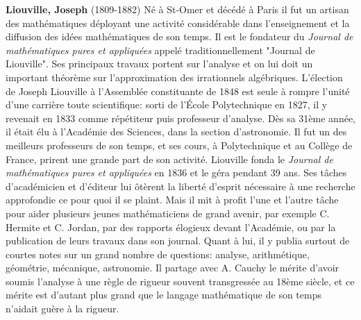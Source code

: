 \textbf{Liouville, Joseph} (1809-1882) Né à St-Omer et décédé à Paris il fut un artisan des mathématiques déployant une activité considérable dans l'enseignement et la diffusion des idées mathématiques de son temps. Il est le fondateur du \textit{Journal de mathématiques pures et appliquées} appelé traditionnellement "Journal de Liouville". Ses principaux travaux portent sur l'analyse et on lui doit un important théorème sur l'approximation des irrationnels algébriques. L'élection de Joseph Liouville à l'Assemblée constituante de 1848 est seule à rompre l'unité d'une carrière toute scientifique: sorti de l'École Polytechnique en 1827, il y revenait en 1833 comme répétiteur puis professeur d'analyse. Dès sa 31ème année, il était élu à l'Académie des Sciences, dans la section d'astronomie. Il fut un des meilleurs professeurs de son temps, et ses cours, à Polytechnique et au Collège de France, prirent une grande part de son activité. Liouville fonda le \textit{Journal de mathématiques pures et appliquées} en 1836 et le géra pendant 39 ans. Ses tâches d'académicien et d'éditeur lui ôtèrent la liberté d'esprit nécessaire à une recherche approfondie ce pour quoi il se plaint. Mais il mit à profit l'une et l'autre tâche pour aider plusieurs jeunes mathématiciens de grand avenir, par exemple C. Hermite et C. Jordan, par des rapports élogieux devant l'Académie, ou par la publication de leurs travaux dans son journal. Quant à lui, il y publia surtout de courtes notes sur un grand nombre de questions: analyse, arithmétique, géométrie, mécanique, astronomie. Il partage avec A. Cauchy le mérite d'avoir soumis l'analyse à une règle de rigueur souvent transgressée au 18ème siècle, et ce mérite est d'autant plus grand que le langage mathématique de son temps n'aidait guère à la rigueur.

